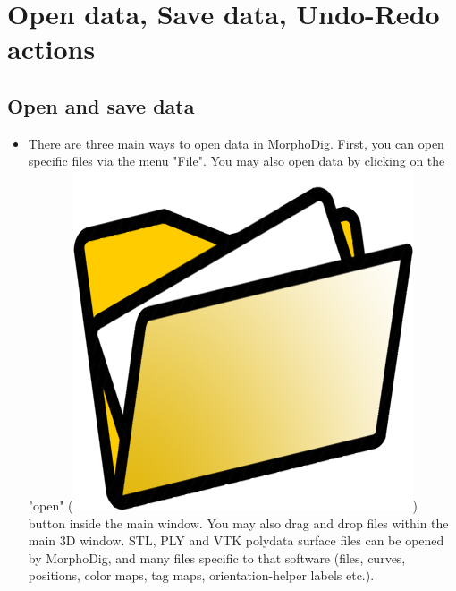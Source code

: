 \chapter{Open data, Save data, Undo-Redo actions}
\minitoc  

 \section{Open and save data}


\begin{itemize}
\item There are three main ways to open data in MorphoDig. First, you can open specific files via the menu "File". You may also open data by clicking on the "open" (\includegraphics[scale=0.03]{images/03/open_data.png}) button inside the main window. You may also drag and drop files within the main 3D window.  
STL, PLY and VTK polydata surface files can be opened by MorphoDig, and many files specific to that software (files, curves, positions, color maps, tag maps, orientation-helper labels etc.).

\end{itemize}
